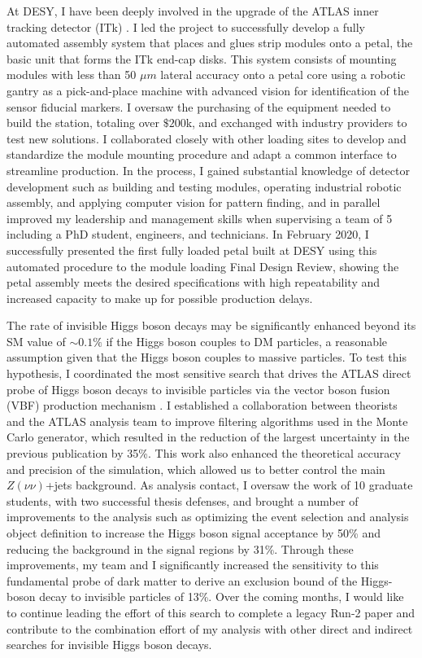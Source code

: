 \documentclass[a4paper]{article}
\begin{document}
At DESY, I have been deeply involved in the upgrade of the ATLAS inner tracking detector (ITk) \cite{ITKstrips}. I led the project to successfully develop a fully automated assembly system that places and glues strip modules onto a petal, the basic unit that forms the ITk end-cap disks. This system consists of mounting modules with less than 50 $\mu m$ lateral accuracy onto a petal core using a robotic gantry as a pick-and-place machine with advanced vision for identification of the sensor fiducial markers. I oversaw the purchasing of the equipment needed to build the station, totaling over $\$200$k, and exchanged with industry providers to test new solutions. I collaborated closely with other loading sites to develop and standardize the module mounting procedure and adapt a common interface to streamline production. In the process, I gained substantial knowledge of detector development such as building and testing modules, operating industrial robotic assembly, and applying computer vision for pattern finding, and in parallel improved my leadership and management skills when supervising a team of 5 including a PhD student, engineers, and technicians. In February 2020, I successfully presented the first fully loaded petal built at DESY using this automated procedure to the module loading Final Design Review, showing the petal assembly meets the desired specifications with high repeatability and increased capacity to make up for possible production delays.

\bigskip

The rate of invisible Higgs boson decays may be significantly enhanced beyond its SM value of $\sim0.1\%$ if the Higgs boson couples to DM particles,
a reasonable assumption given that the Higgs boson couples to massive particles. To test this hypothesis,  I coordinated the most sensitive search that drives the ATLAS direct probe of Higgs boson decays to invisible particles via the vector boson fusion (VBF) production mechanism \cite{vbfMET_CONF2020}. I established a collaboration between theorists and the ATLAS analysis team to improve filtering algorithms used in the Monte Carlo generator, which resulted in the reduction of the largest uncertainty in the previous publication by 35\%. This work also enhanced the theoretical accuracy and precision of the simulation, which allowed us to better control the main $Z\left(\nu\nu\right)$+jets background. As analysis
contact, I oversaw the work of 10 graduate students, with two successful thesis defenses, and brought a number of improvements to the analysis such as optimizing the event selection and analysis object definition to increase the Higgs boson signal acceptance by 50\% and reducing the background in the signal regions by 31\%. Through these improvements, my team and I significantly increased the sensitivity to this fundamental probe of dark matter to derive an exclusion bound of the Higgs-boson decay to invisible particles of 13\%. Over the coming months, I would like to continue leading the effort of this search to complete a legacy Run-2 paper and contribute to the combination effort of my analysis with other direct and indirect searches for invisible Higgs boson decays.
\end{document}
